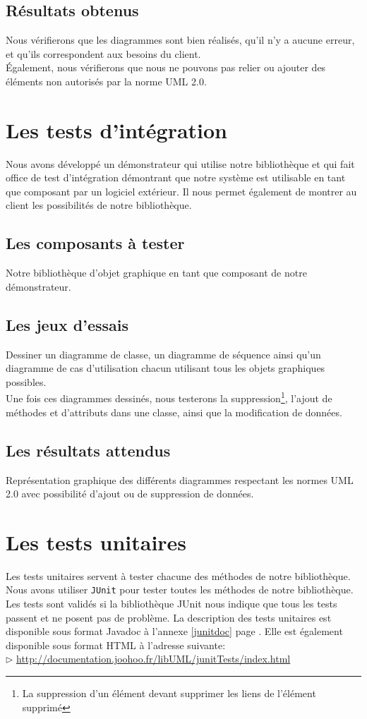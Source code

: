 \documentclass[12pt,a4paper,openany]{report}
\begin{document}
		\subsection{Résultats obtenus}
		Nous vérifierons que les diagrammes sont bien réalisés, qu'il n'y a aucune erreur, et qu'ils correspondent aux besoins du client.\\
		Également, nous vérifierons que nous ne pouvons pas relier ou ajouter des éléments non autorisés par la norme UML 2.0.

	\section{Les tests d'intégration}
		Nous avons développé un démonstrateur qui utilise notre bibliothèque et qui fait office de test d'intégration démontrant que notre système
		est utilisable en tant que composant par un logiciel extérieur. Il nous permet également de montrer au client les possibilités de notre bibliothèque.

		\subsection{Les composants à tester}
			Notre bibliothèque d'objet graphique en tant que composant de notre démonstrateur.

			\subsection{Les jeux d'essais}
			Dessiner un diagramme de classe, un diagramme de séquence ainsi qu'un diagramme de cas d'utilisation chacun utilisant tous les objets graphiques 
			possibles. \\
			Une fois ces diagrammes dessinés, nous testerons la suppression\footnote{La suppression d'un élément devant supprimer les liens de l'élément supprimé},
			l'ajout de méthodes et d'attributs dans une classe, ainsi que la modification de données.

			\subsection{Les résultats attendus}
			Représentation graphique des différents diagrammes respectant les normes UML 2.0 avec possibilité d'ajout ou de suppression de données.
	\section{Les tests unitaires}
	Les tests unitaires servent à tester chacune des méthodes de notre bibliothèque.\\
	Nous avons utiliser \texttt{JUnit} pour tester toutes les méthodes de notre bibliothèque. Les tests sont validés si 
	la bibliothèque JUnit nous indique que tous les tests passent et ne posent pas de problème.
	La description des tests unitaires est disponible sous format Javadoc à l'annexe \ref{junitdoc} page \pageref{junitdoc}.
	Elle est également disponible sous format HTML à l'adresse suivante: \\
	$\rhd$ \url{http://documentation.joohoo.fr/libUML/junitTests/index.html}\\
		
\end{document}
